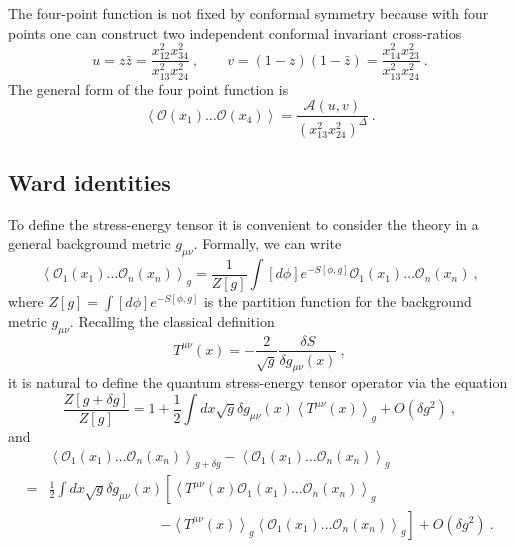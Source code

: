 \documentclass{ws-rv9x6}
\newcommand\be{\begin{equation}}
\newcommand\ee{\end{equation}}
\begin{document}
The four-point function is not fixed by conformal symmetry because
with four points one can construct two independent conformal invariant
cross-ratios
\be
u=z\bar{z}=\frac{x_{12}^{2}x_{34}^{2}}{x_{13}^{2}x_{24}^{2}}\ ,\qquad v=(1-z)(1-\bar{z})=\frac{x_{14}^{2}x_{23}^{2}}{x_{13}^{2}x_{24}^{2}}\ .
\label{crossratios}
\ee
The general form of the four point function is
\be
\left\langle \mathcal{O}(x_{1})\dots\mathcal{O}(x_{4})\right\rangle =\frac{\mathcal{A}(u,v)}{\left(x_{13}^{2}x_{24}^{2}\right)^{\Delta}}\ .
\ee



\subsection{Ward identities}

To define the stress-energy tensor it is convenient to consider the
theory in a general background metric $g_{\mu\nu}$. Formally, we
can write
\be
\left\langle \mathcal{O}_{1}(x_{1})\dots\mathcal{O}_{n}(x_{n})\right\rangle _{g}=\frac{1}{Z[g]}\int[d\phi]e^{-S[\phi,g]}\mathcal{O}_{1}(x_{1})\dots\mathcal{O}_{n}(x_{n})\ ,
\ee
 where $Z[g]=\int[d\phi]e^{-S[\phi,g]}$ is the partition function
for the background metric $g_{\mu\nu}$. Recalling the classical definition
\be
T^{\mu\nu}(x)=-\frac{2}{\sqrt{g}}\frac{\delta S}{\delta g_{\mu\nu}(x)}\ ,
\ee
it is natural to define the quantum stress-energy tensor operator
via the equation
\be
\frac{Z[g+\delta g]}{Z[g]}=1+\frac{1}{2}\int dx\sqrt{g}\delta g_{\mu\nu}(x)\left\langle T^{\mu\nu}(x)\right\rangle _{g}+O(\delta g^{2})\ ,
\ee
and
\begin{align}
 & \left\langle \mathcal{O}_{1}(x_{1})\dots\mathcal{O}_{n}(x_{n})\right\rangle _{g+\delta g}-\left\langle \mathcal{O}_{1}(x_{1})\dots\mathcal{O}_{n}(x_{n})\right\rangle _{g}\nonumber \\
= & \frac{1}{2}\int dx\sqrt{g}\delta g_{\mu\nu}(x)\left[\left\langle T^{\mu\nu}(x)\mathcal{O}_{1}(x_{1})\dots\mathcal{O}_{n}(x_{n})\right\rangle _{g}\right. \label{eq:Tmunufrommetricvariation}\\
&\qquad \qquad \qquad \qquad \left.
-\left\langle T^{\mu\nu}(x)\right\rangle _{g}\left\langle \mathcal{O}_{1}(x_{1})\dots\mathcal{O}_{n}(x_{n})\right\rangle _{g}\right]+O(\delta g^{2})\ .\nonumber 
\end{align}
\end{document}
